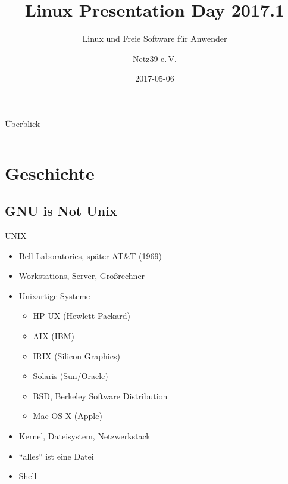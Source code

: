 \documentclass{beamer}
\title{Linux Presentation Day 2017.1}
\subtitle{Linux und Freie Software für Anwender}
\author{Netz39 e.\,V.}
\institute{\url{http://www.netz39.de/}}
\date{2017-05-06}
\begin{document}
\begin{frame}
	\titlepage
\end{frame}

\logo{
    
}

\begin{frame}{Überblick}
    \begin{columns}[T]
        \begin{column}{0.5\textwidth}
            \tableofcontents
        \end{column}
        \begin{column}{0.5\textwidth}
            
        \end{column}
    \end{columns}
\end{frame}

\section{Geschichte}

\subsection{GNU is Not Unix}

\begin{frame}{UNIX}
    \begin{itemize}
        \item Bell Laboratories, später AT\&T (1969)
        \item Workstations, Server, Großrechner
        \item Unixartige Systeme
            \begin{itemize}
                \item HP-UX (Hewlett-Packard)
                \item AIX (IBM)
                \item IRIX (Silicon Graphics)
                \item Solaris (Sun/Oracle)
                \item BSD, Berkeley Software Distribution
                \item Mac OS X (Apple)
            \end{itemize}
        \item Kernel, Dateisystem, Netzwerkstack
        \item \enquote{alles} ist eine Datei
        \item Shell
    \end{itemize}
\end{frame}
\end{document}
